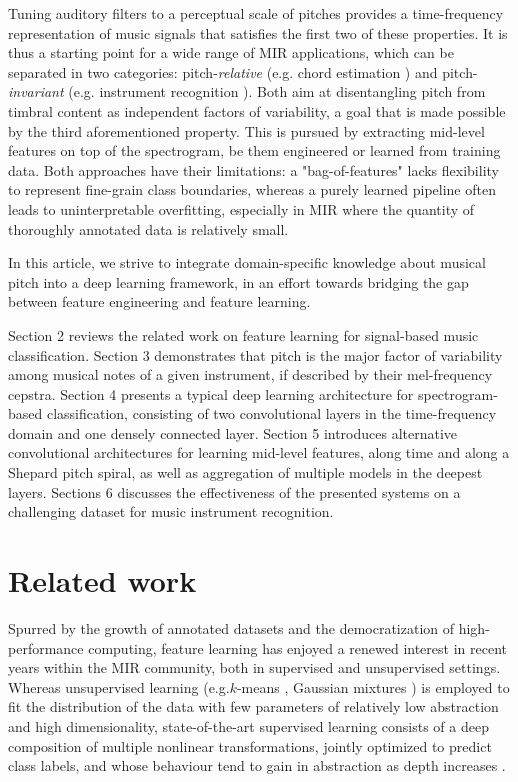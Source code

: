 \documentclass{article}
\makeatletter
\newcommand*{\eg}{e.g.\@\xspace}
\makeatother
\begin{document}
Tuning auditory filters to a perceptual scale of pitches provides a
time-frequency representation of music signals that satisfies the first two of these properties.
It is thus a starting point for a wide range of MIR applications,
which can be separated in two categories: pitch-\emph{relative}
(\eg chord estimation \cite{Humphrey2012tonnetz})
and pitch-\emph{invariant} (\eg instrument recognition \cite{Eronen2000}).
Both aim at disentangling pitch from timbral content as independent
factors of variability, a goal that is made possible by the third aforementioned property.
This is pursued by extracting mid-level features on top of the spectrogram,
be them engineered or learned from training data.
Both approaches have their limitations: a "bag-of-features" lacks flexibility
to represent fine-grain class boundaries, whereas a purely learned pipeline
often leads to uninterpretable overfitting, especially in MIR where the quantity
of thoroughly annotated data is relatively small.

In this article, we strive to integrate domain-specific knowledge about musical
pitch into a deep learning framework, in an effort towards bridging the gap
between feature engineering and feature learning.

Section 2 reviews the related work on feature learning for signal-based music
classification.
Section 3 demonstrates that pitch is the major factor of variability among musical
notes of a given instrument, if described by their mel-frequency cepstra.
Section 4 presents a typical deep learning architecture for spectrogram-based
classification, consisting of two convolutional layers in the time-frequency
domain and one densely connected layer.
Section 5 introduces alternative convolutional architectures for learning
mid-level features, along time and along a Shepard pitch spiral, as well as
aggregation of multiple models in the deepest layers.
Sections 6 discusses the effectiveness of the presented systems on a challenging
dataset for music instrument recognition.

\section{Related work}
Spurred by the growth of annotated datasets and the democratization of
high-performance computing, feature learning has enjoyed a renewed interest
in recent years within the MIR community, both in supervised and unsupervised
settings.
Whereas unsupervised learning (\eg $k$-means \cite{Stowell2014}, Gaussian
mixtures \cite{Joder2009}) is employed to fit the distribution of the data with
few parameters of relatively low abstraction
and high dimensionality, state-of-the-art supervised learning consists of a deep
composition of multiple nonlinear transformations, jointly optimized
to predict class labels, and whose behaviour tend to gain in abstraction as depth
increases \cite{vandenOord2013}.
\end{document}
